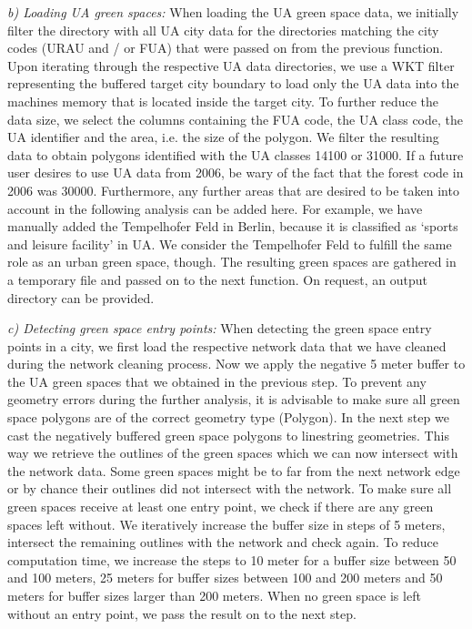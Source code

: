 \documentclass[10pt]{article}
\begin{document}
\textit{b) Loading UA green spaces:} When loading the UA green space data, we initially filter the directory with all UA city data for the directories matching the city codes (URAU and / or FUA) that were passed on from the previous function. Upon iterating through the respective UA data directories, we use a WKT filter representing the buffered target city boundary to load only the UA data into the machines memory that is located inside the target city. To further reduce the data size, we select the columns containing the FUA code, the UA class code, the UA identifier and the area, i.e. the size of the polygon. We filter the resulting data to obtain polygons identified with the UA classes 14100 or 31000. If a future user desires to use UA data from 2006, be wary of the fact that the forest code in 2006 was 30000. Furthermore, any further areas that are desired to be taken into account in the following analysis can be added here. For example, we have manually added the Tempelhofer Feld in Berlin, because it is classified as ‘sports and leisure facility’ in UA. We consider the Tempelhofer Feld to fulfill the same role as an urban green space, though. The resulting green spaces are gathered in a temporary file and passed on to the next function. On request, an output directory can be provided.

\textit{c) Detecting green space entry points:} When detecting the green space entry points in a city, we first load the respective network data that we have cleaned during the network cleaning process. Now we apply the negative 5 meter buffer to the UA green spaces that we obtained in the previous step. To prevent any geometry errors during the further analysis, it is advisable to make sure all green space polygons are of the correct geometry type (Polygon). In the next step we cast the negatively buffered green space polygons to linestring geometries. This way we retrieve the outlines of the green spaces which we can now intersect with the network data. Some green spaces might be to far from the next network edge or by chance their outlines did not intersect with the network. To make sure all green spaces receive at least one entry point, we check if there are any green spaces left without. We iteratively increase the buffer size in steps of 5 meters, intersect the remaining outlines with the network and check again. To reduce computation time, we increase the steps to 10 meter for a buffer size between 50 and 100 meters, 25 meters for buffer sizes between 100 and 200 meters and 50 meters for buffer sizes larger than 200 meters. When no green space is left without an entry point, we pass the result on to the next step.
\end{document}
